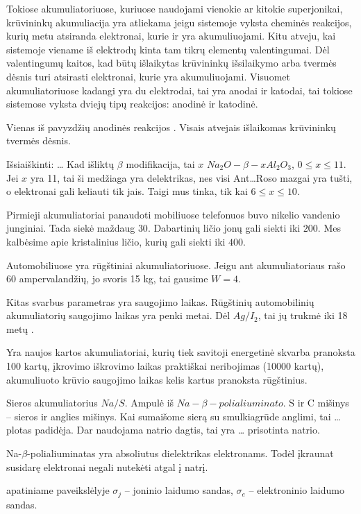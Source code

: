 Tokiose akumuliatoriuose, kuriuose naudojami vienokie ar kitokie
superjonikai, krūvininkų akumuliacija yra atliekama jeigu sistemoje
vyksta cheminės reakcijos, kurių metu atsiranda elektronai, kurie
ir yra akumuliuojami. Kitu atveju, kai sistemoje viename iš
elektrodų kinta tam tikrų elementų valentingumai. Dėl valentingumų
kaitos, kad būtų išlaikytas krūvininkų išsilaikymo arba tvermės
dėsnis turi atsirasti elektronai, kurie yra akumuliuojami.
Visuomet akumuliatoriuose kadangi yra du elektrodai, tai yra anodai
ir katodai, tai tokiose sistemose vyksta dviejų tipų reakcijos:
anodinė ir katodinė.

Vienas iš pavyzdžių anodinės reakcijos .
Visais atvejais išlaikomas krūvininkų tvermės dėsnis.

Išsiaiškinti:
…
Kad išliktų $\beta$ modifikacija, tai $x$ $Na_{2}O-\beta-x Al_{2}O_{3}$,
$0 \leq x \leq 11$. Jei $x$ yra 11, tai ši medžiaga yra delektrikas,
nes visi Ant…Roso mazgai yra tušti, o elektronai gali keliauti tik
jais. Taigi mus tinka, tik kai $6 \leq x \leq 10$.

Pirmieji akumuliatoriai panaudoti mobiliuose telefonuos buvo nikelio
vandenio junginiai. Tada siekė maždaug $30$. Dabartinių ličio
jonų gali siekti iki $200$. Mes kalbėsime apie kristalinius
ličio, kurių gali siekti iki $400$.

Automobiliuose yra rūgštiniai akumuliatoriuose. Jeigu ant akumuliatoriaus
rašo 60 ampervalandžių, jo svoris 15 kg, tai gausime $W=4$.

Kitas svarbus parametras yra saugojimo laikas. Rūgštinių automobilinių
akumuliatorių saugojimo laikas yra penki metai. Dėl $Ag/I_{2}$, tai
jų trukmė iki 18 metų .

Yra naujos kartos akumuliatoriai, kurių tiek savitoji energetinė
skvarba pranoksta 100 kartų, įkrovimo iškrovimo laikas praktiškai
neribojimas (10000 kartų), akumuliuoto krūvio saugojimo laikas
kelis kartus pranoksta rūgštinius.

Sieros akumuliatorius  $Na/S$. Ampulė iš
$Na-\beta-polialiuminato$. S ir C mišinys – sieros ir anglies mišinys.
Kai sumaišome sierą su smulkiagrūde anglimi, tai … plotas padidėja.
Dar naudojama natrio dagtis, tai yra … prisotinta natrio.

Na-$\beta$-polialiuminatas yra absoliutus dielektrikas elektronams.
Todėl įkraunat susidarę elektronai negali nutekėti atgal į natrį.

 apatiniame paveikslėlyje $\sigma_{j}$ – joninio laidumo
sandas, $\sigma_{e}$ – elektroninio laidumo sandas.

